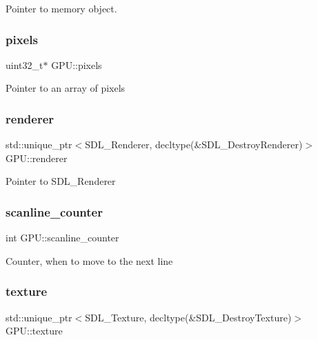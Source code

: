 Pointer to memory object. \mbox{\label{classGPU_abf17e918bdde2a603aaaf9e0e1693e89}} 
\subsubsection{\texorpdfstring{pixels}{pixels}}
{\footnotesize\ttfamily uint32\+\_\+t$\ast$ G\+P\+U\+::pixels\hspace{0.3cm}{\ttfamily [private]}}

Pointer to an array of pixels \mbox{\label{classGPU_a166f896881a453e5160a4b33810492e7}} 
\subsubsection{\texorpdfstring{renderer}{renderer}}
{\footnotesize\ttfamily std\+::unique\+\_\+ptr$<$S\+D\+L\+\_\+\+Renderer, decltype(\&S\+D\+L\+\_\+\+Destroy\+Renderer)$>$ G\+P\+U\+::renderer\hspace{0.3cm}{\ttfamily [private]}}

Pointer to S\+D\+L\+\_\+\+Renderer \mbox{\label{classGPU_ad54a548926ae8f782f599339939d3454}} 
\subsubsection{\texorpdfstring{scanline\+\_\+counter}{scanline\_counter}}
{\footnotesize\ttfamily int G\+P\+U\+::scanline\+\_\+counter\hspace{0.3cm}{\ttfamily [private]}}

Counter, when to move to the next line \mbox{\label{classGPU_a08c8831c262733c78b0bbd82488254f6}} 
\subsubsection{\texorpdfstring{texture}{texture}}
{\footnotesize\ttfamily std\+::unique\+\_\+ptr$<$S\+D\+L\+\_\+\+Texture, decltype(\&S\+D\+L\+\_\+\+Destroy\+Texture)$>$ G\+P\+U\+::texture\hspace{0.3cm}{\ttfamily [private]}}


